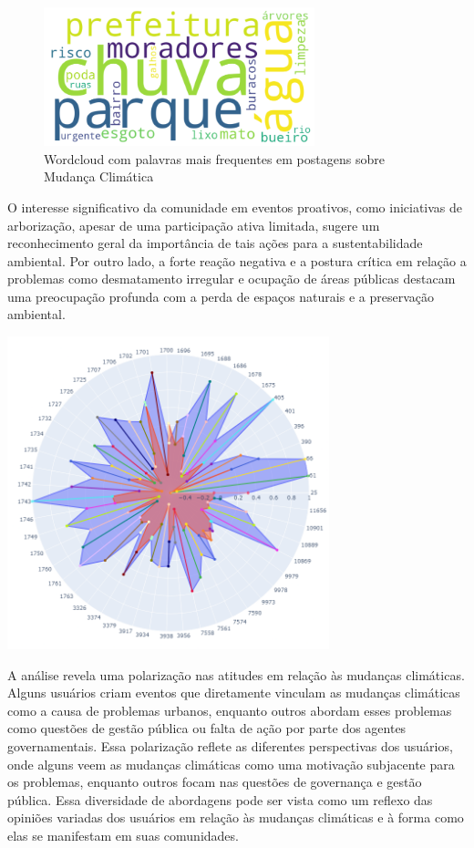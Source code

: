 \begin{figure}[htb]
	\centering
	\includegraphics[width=0.7\textwidth]{images/wordcloud_weather.png}
	\caption{Wordcloud com palavras mais frequentes em postagens sobre Mudança Climática}
	\label{fig:wordcloud_weather}
\end{figure}

O interesse significativo da comunidade em eventos proativos, como iniciativas de arborização, apesar de uma participação ativa limitada, sugere um reconhecimento geral da importância de tais ações para a sustentabilidade ambiental. Por outro lado, a forte reação negativa e a postura crítica em relação a problemas como desmatamento irregular e ocupação de áreas públicas destacam uma preocupação profunda com a perda de espaços naturais e a preservação ambiental.

\begin{quadro}[htb]
	\centering
	\includegraphics[width=0.7\textwidth]{images/social_barometer_weather.png}
	\caption{Gráfico de Radar ilustrando a pressão social em relação ao tópico de Mudança Climática.}
	\label{fig:social_barometer_weather}
\end{quadro}

A análise revela uma polarização nas atitudes em relação às mudanças climáticas. Alguns usuários criam eventos que diretamente vinculam as mudanças climáticas como a causa de problemas urbanos, enquanto outros abordam esses problemas como questões de gestão pública ou falta de ação por parte dos agentes governamentais. Essa polarização reflete as diferentes perspectivas dos usuários, onde alguns veem as mudanças climáticas como uma motivação subjacente para os problemas, enquanto outros focam nas questões de governança e gestão pública. Essa diversidade de abordagens pode ser vista como um reflexo das opiniões variadas dos usuários em relação às mudanças climáticas e à forma como elas se manifestam em suas comunidades.


